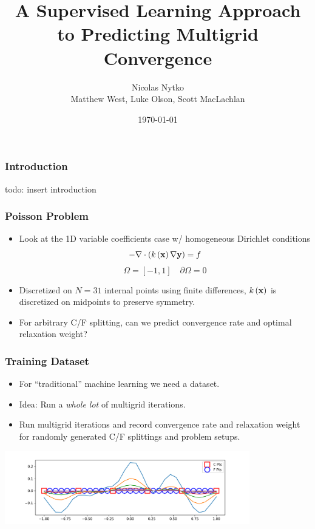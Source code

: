 \documentclass[handout]{beamer}
\title{A Supervised Learning Approach to Predicting Multigrid Convergence}
\author[N. Nytko]{Nicolas Nytko\\[3mm]Matthew West, Luke Olson, Scott MacLachlan}
\date{\today}
\renewcommand{\vec}[1]{ {\bf #1} }
\begin{document}
\frame{\titlepage}


\begin{frame}
  \frametitle{Introduction}
  todo: insert introduction
\end{frame}


\begin{frame}
  \frametitle{Poisson Problem}
  \begin{itemize}
  \item Look at the 1D variable coefficients case w/ homogeneous Dirichlet conditions
    \[ -\nabla \cdot \left(k\left(\vec{x}\right) \nabla \vec{y} \right) = f \]
    \[ \Omega = \left[-1, 1\right] \quad \partial\Omega = 0 \]
  \item Discretized on $N=31$ internal points using finite differences, $k\left(\vec{x}\right)$ is discretized on midpoints to preserve symmetry.
  \item For arbitrary C/F splitting, can we predict convergence rate and optimal relaxation weight?
  \end{itemize}
\end{frame}


\begin{frame}
  \frametitle{Training Dataset}
  \begin{itemize}
  \item For ``traditional'' machine learning we need a dataset.
    \pause
  \item Idea: Run a \textit{whole lot} of multigrid iterations.
    \pause
  \item Run multigrid iterations and record convergence rate and relaxation weight for randomly generated C/F splittings and problem setups.
  \end{itemize}
  \begin{center}
    \includegraphics[width=0.8\textwidth]{figures/multigrid.png}
  \end{center}
\end{frame}
\end{document}
